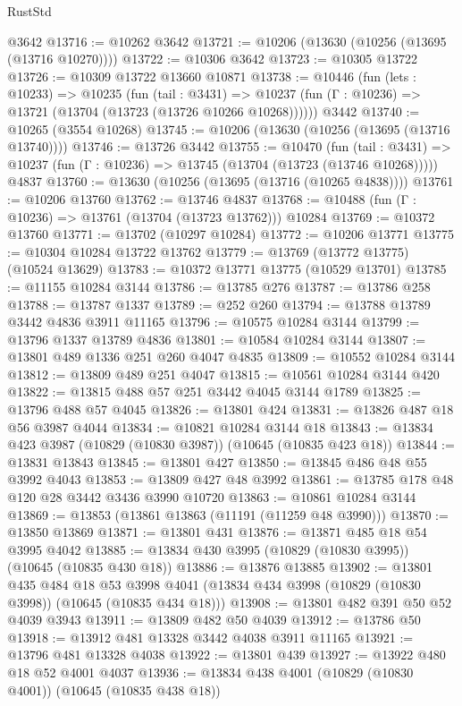 \begin{lexlean}{RustStd}
\begin{coremodule}
    @3642
@13716 := @10262 @3642
@13721 := @10206 (@13630 (@10256 (@13695 (@13716 @10270))))
@13722 := @10306 @3642
@13723 := @10305 @13722
@13726 := @10309 @13722 @13660 @10871
@13738 := @10446
    (fun (lets : @10233) =>
    @10235
      (fun (tail : @3431) =>
      @10237 (fun (Γ : @10236) => @13721 (@13704 (@13723 (@13726 @10266 @10268))))))
    @3442
@13740 := @10265 (@3554 @10268)
@13745 := @10206 (@13630 (@10256 (@13695 (@13716 @13740))))
@13746 := @13726 @3442
@13755 := @10470
    (fun (tail : @3431) => @10237 (fun (Γ : @10236) => @13745 (@13704 (@13723 (@13746 @10268)))))
    @4837
@13760 := @13630 (@10256 (@13695 (@13716 (@10265 @4838))))
@13761 := @10206 @13760
@13762 := @13746 @4837
@13768 := @10488 (fun (Γ : @10236) => @13761 (@13704 (@13723 @13762))) @10284
@13769 := @10372 @13760
@13771 := @13702 (@10297 @10284)
@13772 := @10206 @13771
@13775 := @10304 @10284 @13722 @13762
@13779 := @13769 (@13772 @13775) (@10524 @13629)
@13783 := @10372 @13771 @13775 (@10529 @13701)
@13785 := @11155 @10284 @3144
@13786 := @13785 @276
@13787 := @13786 @258
@13788 := @13787 @1337
@13789 := @252 @260
@13794 := @13788 @13789 @3442 @4836 @3911 @11165
@13796 := @10575 @10284 @3144
@13799 := @13796 @1337 @13789 @4836
@13801 := @10584 @10284 @3144
@13807 := @13801 @489 @1336 @251 @260 @4047 @4835
@13809 := @10552 @10284 @3144
@13812 := @13809 @489 @251 @4047
@13815 := @10561 @10284 @3144 @420
@13822 := @13815 @488 @57 @251 @3442 @4045 @3144 @1789
@13825 := @13796 @488 @57 @4045
@13826 := @13801 @424
@13831 := @13826 @487 @18 @56 @3987 @4044
@13834 := @10821 @10284 @3144 @18
@13843 := @13834 @423 @3987 (@10829 (@10830 @3987)) (@10645 (@10835 @423 @18))
@13844 := @13831 @13843
@13845 := @13801 @427
@13850 := @13845 @486 @48 @55 @3992 @4043
@13853 := @13809 @427 @48 @3992
@13861 := @13785 @178 @48 @120 @28 @3442 @3436 @3990 @10720
@13863 := @10861 @10284 @3144
@13869 := @13853 (@13861 @13863 (@11191 (@11259 @48 @3990)))
@13870 := @13850 @13869
@13871 := @13801 @431
@13876 := @13871 @485 @18 @54 @3995 @4042
@13885 := @13834 @430 @3995 (@10829 (@10830 @3995)) (@10645 (@10835 @430 @18))
@13886 := @13876 @13885
@13902 := @13801
    @435
    @484
    @18
    @53
    @3998
    @4041
    (@13834 @434 @3998 (@10829 (@10830 @3998)) (@10645 (@10835 @434 @18)))
@13908 := @13801 @482 @391 @50 @52 @4039 @3943
@13911 := @13809 @482 @50 @4039
@13912 := @13786 @50
@13918 := @13912 @481 @13328 @3442 @4038 @3911 @11165
@13921 := @13796 @481 @13328 @4038
@13922 := @13801 @439
@13927 := @13922 @480 @18 @52 @4001 @4037
@13936 := @13834 @438 @4001 (@10829 (@10830 @4001)) (@10645 (@10835 @438 @18))

\end{coremodule}
\end{lexlean}
